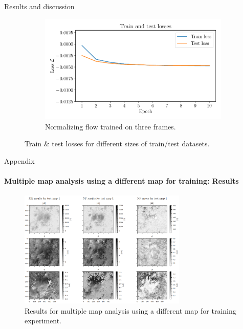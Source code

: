 \documentclass{beamer}
\begin{document}
\begin{frame}[allowframebreaks]{Results and discussion}
\begin{figure}[h]
\begin{subfigure}[t]{0.32\textwidth}
		\centering
		\includegraphics[width=\textwidth]{figures/thesis/nf-milne-eddington-example-5-loss-3train-nflows-piecewisequadratic.pdf}
		\caption{Normalizing flow trained on three frames.}
		\label{fig:nf-milne-eddington-example-5-loss-3train-nflows-piecewisequadratic}
	\end{subfigure}
	\caption{Train \& test losses for different sizes of train/test datasets.}
	\label{fig:nf-milne-eddington-example-5-loss-nflows-piecewisequadratic}
\end{figure}
\end{frame}

\begin{frame}[allowframebreaks]{Appendix}
	\vspace{-0.4cm}
	\framesubtitle{Multiple map analysis using a different map for training: Results} %
	\begin{figure}[h!]
		\centering
		\includegraphics[width=8cm]{figures/presentation/exp4_fig1.png}
		\caption{Results for multiple map analysis using a different map for training experiment.}
		\label{fig:exp4_fig1}
	\end{figure}
\end{frame}
\end{document}
